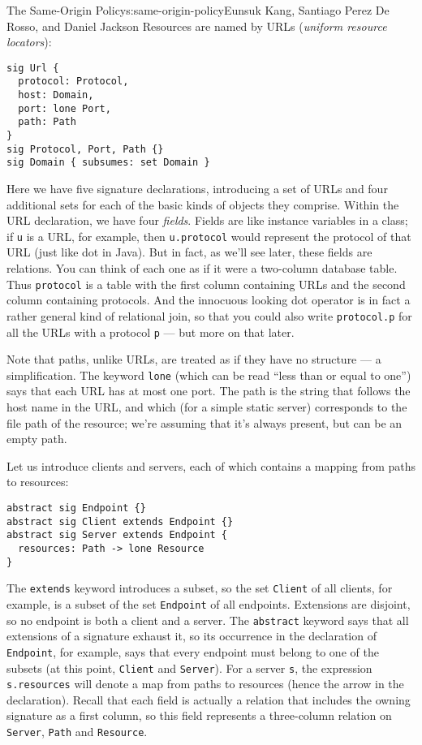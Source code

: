 \begin{aosachapter}{The Same-Origin Policy}{s:same-origin-policy}{Eunsuk Kang, Santiago Perez De Rosso, and Daniel Jackson}
Resources are named by URLs (\emph{uniform resource locators}):

\begin{verbatim}
sig Url {
  protocol: Protocol,
  host: Domain,
  port: lone Port,
  path: Path
}
sig Protocol, Port, Path {}
sig Domain { subsumes: set Domain }
\end{verbatim}

Here we have five signature declarations, introducing a set of URLs and
four additional sets for each of the basic kinds of objects they
comprise. Within the URL declaration, we have four \emph{fields}. Fields
are like instance variables in a class; if \texttt{u} is a URL, for
example, then \texttt{u.protocol} would represent the protocol of that
URL (just like dot in Java). But in fact, as we'll see later, these
fields are relations. You can think of each one as if it were a
two-column database table. Thus \texttt{protocol} is a table with the
first column containing URLs and the second column containing protocols.
And the innocuous looking dot operator is in fact a rather general kind
of relational join, so that you could also write \texttt{protocol.p} for
all the URLs with a protocol \texttt{p} --- but more on that later.

Note that paths, unlike URLs, are treated as if they have no structure
--- a simplification. The keyword \texttt{lone} (which can be read
``less than or equal to one'') says that each URL has at most one port.
The path is the string that follows the host name in the URL, and which
(for a simple static server) corresponds to the file path of the
resource; we're assuming that it's always present, but can be an empty
path.

Let us introduce clients and servers, each of which contains a mapping
from paths to resources:

\begin{verbatim}
abstract sig Endpoint {}
abstract sig Client extends Endpoint {}
abstract sig Server extends Endpoint {
  resources: Path -> lone Resource
}
\end{verbatim}

The \texttt{extends} keyword introduces a subset, so the set
\texttt{Client} of all clients, for example, is a subset of the set
\texttt{Endpoint} of all endpoints. Extensions are disjoint, so no
endpoint is both a client and a server. The \texttt{abstract} keyword
says that all extensions of a signature exhaust it, so its occurrence in
the declaration of \texttt{Endpoint}, for example, says that every
endpoint must belong to one of the subsets (at this point,
\texttt{Client} and \texttt{Server}). For a server \texttt{s}, the
expression \texttt{s.resources} will denote a map from paths to
resources (hence the arrow in the declaration). Recall that each field
is actually a relation that includes the owning signature as a first
column, so this field represents a three-column relation on
\texttt{Server}, \texttt{Path} and \texttt{Resource}.


\end{aosachapter}
